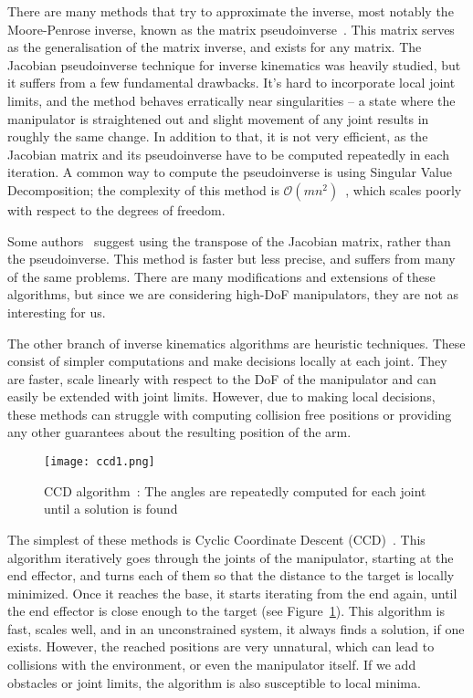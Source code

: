 There are many methods that try to approximate the inverse, most notably the Moore-Penrose inverse, known as the matrix pseudoinverse~\cite{penrose_1955}. This matrix serves as the generalisation of the matrix inverse, and exists for any matrix. The Jacobian pseudoinverse technique for inverse kinematics was heavily studied, but it suffers from a few fundamental drawbacks. It's hard to incorporate local joint limits, and the method behaves erratically near singularities -- a state where the manipulator is straightened out and slight movement of any joint results in roughly the same change.
In addition to that, it is not very efficient, as the Jacobian matrix and its pseudoinverse have to be computed repeatedly in each iteration. A common way to compute the pseudoinverse is using Singular Value Decomposition; the complexity of this method is $\mathcal{O}(mn^2)$~\cite{trefethen1997numerical}, which scales poorly with respect to the degrees of freedom.

Some authors~\cite{Wolovich1984ACT} suggest using the transpose of the Jacobian matrix, rather than the pseudoinverse. This method is faster but less precise, and suffers from many of the same problems. There are many modifications and extensions of these algorithms, but since we are considering high-DoF manipulators, they are not as interesting for us.

The other branch of inverse kinematics algorithms are heuristic techniques. These consist of simpler computations and make decisions locally at each joint. They are faster, scale linearly with respect to the DoF of the manipulator and can easily be extended with joint limits. However, due to making local decisions, these methods can struggle with computing collision free positions or providing any other guarantees about the resulting position of the arm.

\begin{figure}
    \centering
    \texttt{[image: ccd1.png]}
    \caption{CCD algorithm~\cite{Ondika2021thesis}: The angles are repeatedly computed for each joint until a solution is found}
    \label{fig:ccd}
\end{figure}

The simplest of these methods is Cyclic Coordinate Descent (CCD)~\cite{ccd}. This algorithm iteratively goes through the joints of the manipulator, starting at the end effector, and turns each of them so that the distance to the target is locally minimized. Once it reaches the base, it starts iterating from the end again, until the end effector is close enough to the target (see Figure~\ref{fig:ccd}). This algorithm is fast, scales well, and in an unconstrained system, it always finds a solution, if one exists. However, the reached positions are very unnatural, which can lead to collisions with the environment, or even the manipulator itself. If we add obstacles or joint limits, the algorithm is also susceptible to local minima.

